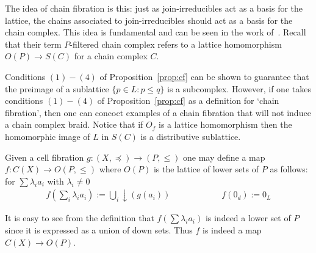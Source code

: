 
The idea of chain fibration is this: just as join-irreducibles act as a basis for the lattice, the chains associated to join-irreducibles should act as a basis for the chain complex. This idea is fundamental and can be seen in the work of~\cite{salamon}.  Recall that their term $P$-filtered chain complex refers to a lattice homomorphism $O(P)\to S(C)$ for a chain complex $C$.  

Conditions $(1)-(4)$ of Proposition~\ref{prop:cf} can be shown to guarantee that the preimage of a sublattice $\{p\in L: p \leq q\}$ is a subcomplex.  However, if one takes conditions $(1)-(4)$ of Proposition~\ref{prop:cf} as a definition for `chain fibration', then one can concoct examples of a chain fibration that will not induce a chain complex braid.  Notice that if $O_f$ is a lattice homomorphism then the homomorphic image of $L$ in $S(C)$ is a distributive sublattice.


Given a cell fibration $g:(X,\preceq)\to (P,\leq)$ one may define a map $f:C(X)\to O(P,\leq)$ where $O(P)$ is the lattice of lower sets of $P$ as follows: for $\sum \lambda_i a_i$ with $\lambda_i\neq 0$
\begin{align} \label{eqn:cell2chain}
f(\sum_i \lambda_i a_i):= \bigcup_i \downarrow (g(a_i))\quad\quad\quad\quad\quad\quad
f(0_d):= 0_L
\end{align}

It is easy to see from the definition that $f(\sum \lambda_i a_i)$ is indeed a lower set of $P$ since it is expressed as a union of down sets.  Thus $f$ is indeed a map $C(X)\to O(P)$.

